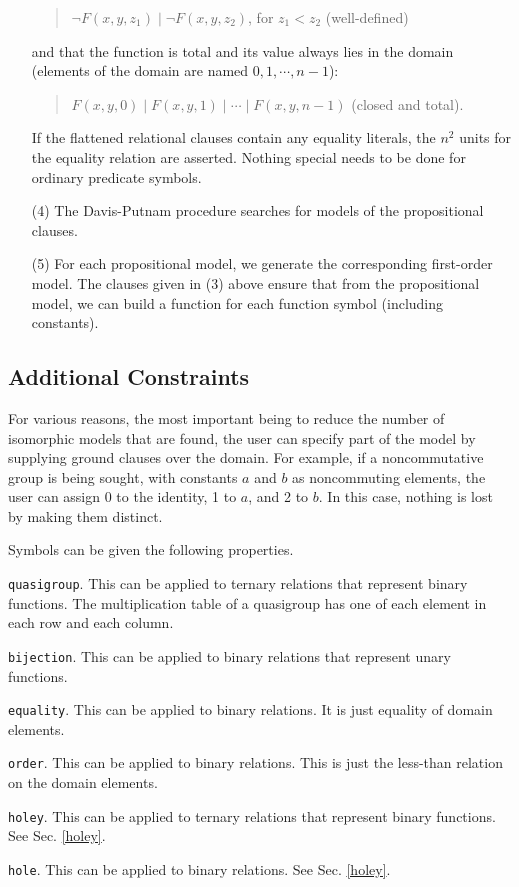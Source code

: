 \begin{enumerate}
\begin{verse}
$\neg F(x,y,z_1) \;|\; \neg F(x,y,z_2)$, for $z_1 < z_2$ (well-defined)
\end{verse}
and that the function is total and its value always lies in the domain
(elements of the domain are named $0, 1, \cdots, n-1$):
\begin{verse}
$F(x,y,0) \;|\; F(x,y,1) \;|\; \cdots \;|\; F(x,y,n-1)$ (closed and total).
\end{verse}
If the flattened relational clauses contain any equality literals,
the $n^2$ units for the equality relation are asserted.
Nothing special needs to be done for ordinary predicate symbols.
\item[(4)]
The Davis-Putnam procedure searches for models of the propositional
clauses.
\item[(5)]
For each propositional model, we generate the corresponding first-order model.
The clauses given in (3) above ensure that from the propositional model,
we can build a function for each function symbol (including constants).
\end{enumerate}

\subsection{Additional Constraints}

For various reasons, the most important being to reduce the number of
isomorphic models that are found, the user can specify part of the 
model by supplying ground clauses over the domain.  For example,
if a noncommutative group is being sought, with constants $a$ and $b$
as noncommuting elements,
the user can assign 0 to the identity, 1 to $a$, and 2 to $b$.
In this case, nothing is lost by making them distinct.

Symbols can be given the following properties.
\begin{description}
\item{\verb:quasigroup:.}
This can be applied to ternary relations that represent binary functions.
The multiplication table of a quasigroup has one of each element in each
row and each column.
\item{\verb:bijection:.}
This can be applied to binary relations that represent unary functions.
\item{\verb:equality:.}
This can be applied to binary relations.  It is just equality of domain
elements.
\item{\verb:order:.}
This can be applied to binary relations.  This is just the less-than
relation on the domain elements.
\item{\verb:holey:.}
This can be applied to ternary relations that represent binary functions.
See Sec. \ref{holey}.
\item{\verb:hole:.}
This can be applied to binary relations.
See Sec. \ref{holey}.
\end{description}

